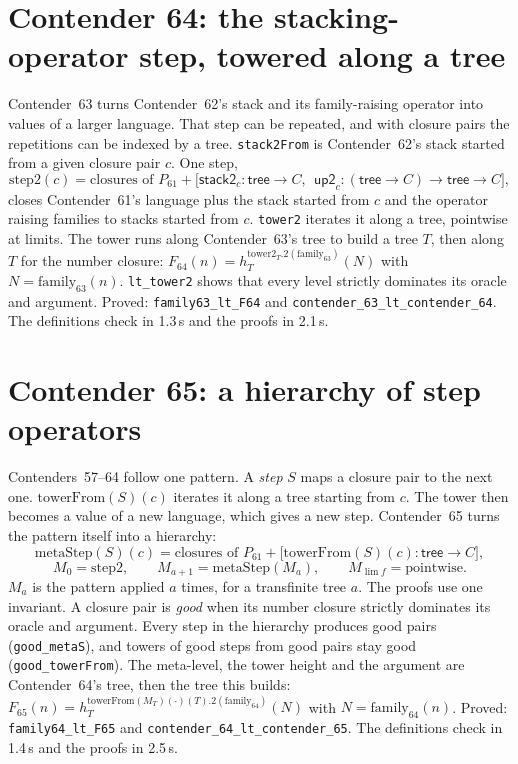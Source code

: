\documentclass[11pt]{article}
\theoremstyle{definition}
\theoremstyle{remark}
\newcommand{\lean}[1]{\texttt{#1}}
\begin{document}
\section{Contender 64: the stacking-operator step, towered along a tree}

Contender~63 turns Contender~62's stack and its family-raising operator into
values of a larger language. That step can be repeated, and with closure pairs
the repetitions can be indexed by a tree. \lean{stack2From} is Contender~62's
stack started from a given closure pair $c$. One step,
\[
\mathrm{step2}(c)=\text{closures of }P_{61}+\bigl[\mathsf{stack2}_c:\mathsf{tree}\to C,\ \
\mathsf{up2}_c:(\mathsf{tree}\to C)\to\mathsf{tree}\to C\bigr],
\]
closes Contender~61's language plus the stack started from $c$ and the operator
raising families to stacks started from $c$. \lean{tower2} iterates it along a
tree, pointwise at limits. The tower runs along Contender~63's tree to build a
tree $T$, then along $T$ for the number closure:
$F_{64}(n)=h^{\mathrm{tower2}_T.2(\mathrm{family}_{63})}_T(N)$ with
$N=\mathrm{family}_{63}(n)$. \lean{lt\_tower2} shows that every level strictly
dominates its oracle and argument. Proved: \lean{family63\_lt\_F64} and
\lean{contender\_63\_lt\_\allowbreak contender\_64}. The definitions check in
1.3\,s and the proofs in 2.1\,s.

\section{Contender 65: a hierarchy of step operators}

Contenders~57--64 follow one pattern. A \emph{step} $S$ maps a closure pair to
the next one. $\mathrm{towerFrom}(S)(c)$ iterates it along a tree starting
from $c$. The tower then becomes a value of a new language, which gives a new
step. Contender~65 turns the pattern itself into a hierarchy:
\[
\mathrm{metaStep}(S)(c)=\text{closures of }P_{61}+\bigl[\mathrm{towerFrom}(S)(c):\mathsf{tree}\to C\bigr],
\]
\[
M_0=\mathrm{step2},\qquad M_{a+1}=\mathrm{metaStep}(M_a),\qquad M_{\lim f}=\text{pointwise}.
\]
$M_a$ is the pattern applied $a$ times, for a transfinite tree $a$. The proofs
use one invariant. A closure pair is \emph{good} when its number closure strictly
dominates its oracle and argument. Every step in the hierarchy produces good
pairs (\lean{good\_metaS}), and towers of good steps from good pairs stay good
(\lean{good\_towerFrom}). The meta-level, the tower height and the argument are
Contender~64's tree, then the tree this builds:
$F_{65}(n)=h^{\mathrm{towerFrom}(M_T)(\cdot)(T).2(\mathrm{family}_{64})}_T(N)$ with
$N=\mathrm{family}_{64}(n)$. Proved: \lean{family64\_lt\_F65} and
\lean{contender\_64\_lt\_\allowbreak contender\_65}. The definitions check in
1.4\,s and the proofs in 2.5\,s.
\end{document}
